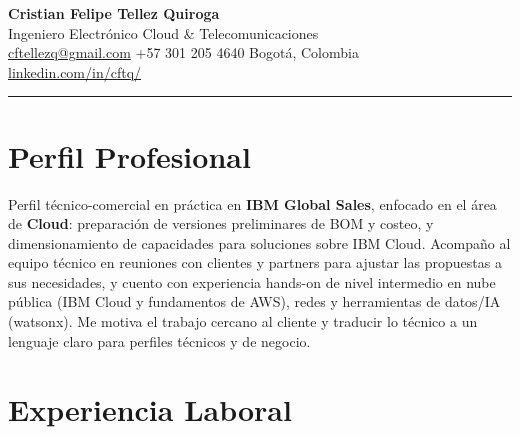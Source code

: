 \documentclass[11pt,a4paper]{article}
\begin{document}
\begin{center}
  {\Huge\bfseries\color{darktext} Cristian Felipe Tellez Quiroga}\\[8pt]
  {\large\color{accent} Ingeniero Electr\'onico \textbar{} Cloud \& Telecomunicaciones}\\[12pt]
  {\small\color{graytext}
    \faEnvelope\hspace{4pt}\href{mailto:cftellezq@gmail.com}{cftellezq@gmail.com}
    \hspace{12pt}
    \faPhone*\hspace{4pt}+57 301 205 4640
    \hspace{12pt}
    \faMapMarker*\hspace{4pt}Bogot\'a, Colombia
  }\\[4pt]
  {\small\color{graytext}
    \faLinkedin\hspace{4pt}\href{https://www.linkedin.com/in/cftq/}{linkedin.com/in/cftq/}
  }
\end{center}

\vspace{-2pt}
\textcolor{accent}{\rule{\linewidth}{2pt}}
\vspace{6pt}

\section{\faUser\hspace{6pt}Perfil Profesional}

Perfil t\'ecnico-comercial en pr\'actica en \textbf{IBM Global Sales}, enfocado en el \'area de \textbf{Cloud}: preparaci\'on de versiones preliminares de BOM y costeo, y dimensionamiento de capacidades para soluciones sobre IBM Cloud. Acompa\~no al equipo t\'ecnico en reuniones con clientes y partners para ajustar las propuestas a sus necesidades, y cuento con experiencia hands-on de nivel intermedio en nube p\'ublica (IBM Cloud y fundamentos de AWS), redes y herramientas de datos/IA (watsonx). Me motiva el trabajo cercano al cliente y traducir lo t\'ecnico a un lenguaje claro para perfiles t\'ecnicos y de negocio.

\section{\faBriefcase\hspace{6pt}Experiencia Laboral}
\end{document}
